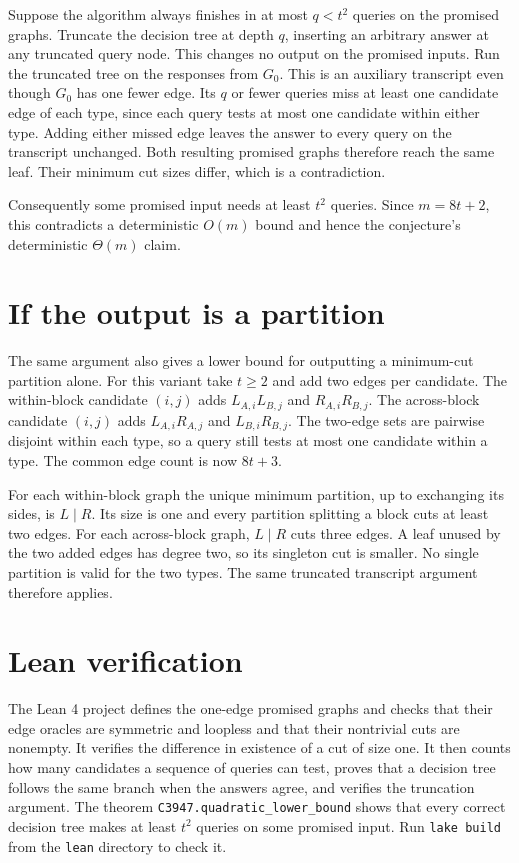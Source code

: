 \documentclass[11pt]{article}
\begin{document}
Suppose the algorithm always finishes in at most $q<t^2$ queries on the
promised graphs. Truncate the decision tree at depth $q$, inserting an
arbitrary answer at any truncated query node. This changes no output on
the promised inputs. Run the truncated tree on the responses from
$G_0$. This is an auxiliary transcript even though $G_0$ has one fewer
edge. Its $q$ or fewer queries miss at least one candidate edge of each
type, since each query tests at most one candidate within either type.
Adding either missed edge leaves the answer to every query on the
transcript unchanged. Both resulting promised graphs therefore reach the
same leaf. Their minimum cut sizes differ, which is a contradiction.

Consequently some promised input needs at least $t^2$ queries. Since
$m=8t+2$, this contradicts a deterministic $O(m)$ bound and hence the
conjecture's deterministic $\Theta(m)$ claim.

\section*{If the output is a partition}

The same argument also gives a lower bound for outputting a minimum-cut
partition alone. For this variant take $t\ge2$ and add two edges per
candidate. The within-block candidate $(i,j)$ adds
$L_{A,i}L_{B,j}$ and $R_{A,i}R_{B,j}$. The across-block candidate $(i,j)$
adds $L_{A,i}R_{A,j}$ and $L_{B,i}R_{B,j}$. The two-edge sets are pairwise
disjoint within each type, so a query still tests at most one candidate
within a type. The common edge count is now $8t+3$.

For each within-block graph the unique minimum partition, up to exchanging
its sides, is $L\mid R$. Its size is one and every partition splitting a
block cuts at least two edges. For each across-block graph, $L\mid R$
cuts three edges. A leaf unused by the two added edges has degree two,
so its singleton cut is smaller. No single partition is valid for the
two types. The same truncated transcript argument therefore applies.

\section*{Lean verification}

The Lean 4 project defines the one-edge promised graphs and checks that
their edge oracles are symmetric and loopless and that their nontrivial
cuts are nonempty. It verifies the difference in existence of a cut of
size one. It then counts how many candidates a sequence of queries can
test, proves that a decision tree follows the same branch when the
answers agree, and verifies the truncation argument. The theorem
\texttt{C3947.quadratic\_lower\_bound} shows that every correct decision
tree makes at least $t^2$ queries on some promised input. Run
\texttt{lake build} from the \texttt{lean} directory to check it.
\end{document}
